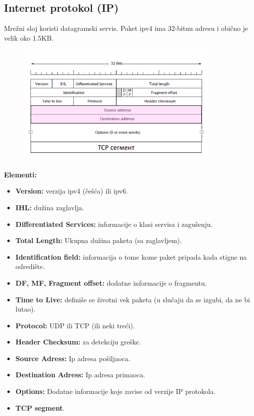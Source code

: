 \documentclass[a4paper]{article}
\begin{document}
    \subsection{Internet protokol (IP)}
    Mrežni sloj koristi datagramski servis. Paket ipv4 ima 32-bitnu adresu i 
    obično je velik oko 1.5KB.
    \begin{figure}[H]
        \begin{center}
            \includegraphics[width=100mm,height=60mm]{Slike/ip_protokol.png}
        \end{center}
    \end{figure}
    \textbf{Elementi:}
    \begin{itemize}
        \item \textbf{Version:} verzija ipv4 (češća) ili ipv6.
        \item \textbf{IHL:} dužina zaglavlja.
        \item \textbf{Differentiated Services:} informacije o klasi servisa i zagušenju.
        \item \textbf{Total Length:} Ukupna dužina paketa (sa zaglavljem).
        \item \textbf{Identification field:} informacija o tome kome paket pripada
              kada stigne na odredište.
        \item \textbf{DF, MF, Fragment offset:} dodatne informacije o fragmentu.
        \item \textbf{Time to Live:} definiše se životni vek paketa (u slučaju da se izgubi,
              da ne bi lutao).
        \item \textbf{Protocol:} UDP ili TCP (ili neki treći).
        \item \textbf{Header Checksum:} za detekciju greške.
        \item \textbf{Source Adress:} Ip adresa pošiljaoca.
        \item \textbf{Destination Adress:} Ip adresa primaoca.
        \item \textbf{Options:} Dodatne informacije koje zavise od verzije IP protokola.
        \item \textbf{TCP segment}.
    \end{itemize}
\end{document}
